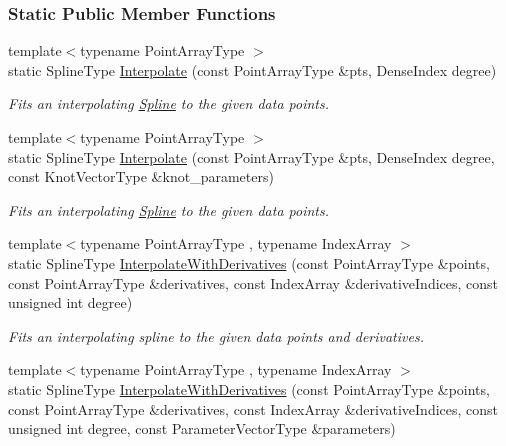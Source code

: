 \subsubsection*{Static Public Member Functions}
\begin{DoxyCompactItemize}
\item 
{\footnotesize template$<$typename Point\+Array\+Type $>$ }\\static Spline\+Type \hyperlink{group___splines___module_adc80b6f0dd0dbbea28130fb254626874}{Interpolate} (const Point\+Array\+Type \&pts, Dense\+Index degree)
\begin{DoxyCompactList}\small\item\em Fits an interpolating \hyperlink{group___splines___module_class_eigen_1_1_spline}{Spline} to the given data points. \end{DoxyCompactList}\item 
{\footnotesize template$<$typename Point\+Array\+Type $>$ }\\static Spline\+Type \hyperlink{group___splines___module_af08185c8b635283f7c76efe91576cc83}{Interpolate} (const Point\+Array\+Type \&pts, Dense\+Index degree, const Knot\+Vector\+Type \&knot\+\_\+parameters)
\begin{DoxyCompactList}\small\item\em Fits an interpolating \hyperlink{group___splines___module_class_eigen_1_1_spline}{Spline} to the given data points. \end{DoxyCompactList}\item 
{\footnotesize template$<$typename Point\+Array\+Type , typename Index\+Array $>$ }\\static Spline\+Type \hyperlink{group___splines___module_a7bd937fdcfa168dbdc27932886a4da9f}{Interpolate\+With\+Derivatives} (const Point\+Array\+Type \&points, const Point\+Array\+Type \&derivatives, const Index\+Array \&derivative\+Indices, const unsigned int degree)
\begin{DoxyCompactList}\small\item\em Fits an interpolating spline to the given data points and derivatives. \end{DoxyCompactList}\item 
{\footnotesize template$<$typename Point\+Array\+Type , typename Index\+Array $>$ }\\static Spline\+Type \hyperlink{group___splines___module_a0317c97f2b57ccf5dcf077409d51e54d}{Interpolate\+With\+Derivatives} (const Point\+Array\+Type \&points, const Point\+Array\+Type \&derivatives, const Index\+Array \&derivative\+Indices, const unsigned int degree, const Parameter\+Vector\+Type \&parameters)

\end{DoxyCompactItemize}
